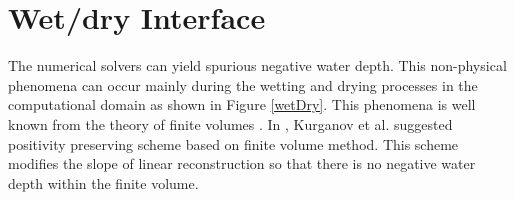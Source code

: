 \section{Wet/dry Interface}

The numerical solvers can yield spurious negative water depth. This non-physical phenomena can occur mainly during the wetting and drying processes in the computational domain as shown in Figure \ref{wetDry}. This phenomena is well known from the theory of finite volumes \cite{audusse, Audusse2005, cotoJe, Casulli2009, 
Fiser2014, Hou2013, Hou2014, Kesserwani2013, Medeiros2013}. In \cite{kurg2}, Kurganov et al. suggested positivity preserving scheme based on finite volume method. This scheme modifies the slope of linear reconstruction so that there is no negative water depth within the finite volume.

